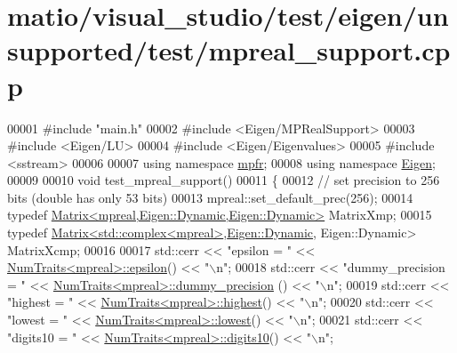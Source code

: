 \hypertarget{matio_2visual__studio_2test_2eigen_2unsupported_2test_2mpreal__support_8cpp_source}{}\section{matio/visual\+\_\+studio/test/eigen/unsupported/test/mpreal\+\_\+support.cpp}
\label{matio_2visual__studio_2test_2eigen_2unsupported_2test_2mpreal__support_8cpp_source}

\begin{DoxyCode}
00001 \textcolor{preprocessor}{#include "main.h"}
00002 \textcolor{preprocessor}{#include <Eigen/MPRealSupport>}
00003 \textcolor{preprocessor}{#include <Eigen/LU>}
00004 \textcolor{preprocessor}{#include <Eigen/Eigenvalues>}
00005 \textcolor{preprocessor}{#include <sstream>}
00006 
00007 \textcolor{keyword}{using namespace }\hyperlink{namespacempfr}{mpfr};
00008 \textcolor{keyword}{using namespace }\hyperlink{namespace_eigen}{Eigen};
00009 
00010 \textcolor{keywordtype}{void} test\_mpreal\_support()
00011 \{
00012   \textcolor{comment}{// set precision to 256 bits (double has only 53 bits)}
00013   mpreal::set\_default\_prec(256);
00014   \textcolor{keyword}{typedef} \hyperlink{group___core___module_class_eigen_1_1_matrix}{Matrix<mpreal,Eigen::Dynamic,Eigen::Dynamic>} 
      MatrixXmp;
00015   \textcolor{keyword}{typedef} \hyperlink{group___core___module_class_eigen_1_1_matrix}{Matrix<std::complex<mpreal>},\hyperlink{namespace_eigen_ad81fa7195215a0ce30017dfac309f0b2}{Eigen::Dynamic},
      Eigen::Dynamic> MatrixXcmp;
00016 
00017   std::cerr << \textcolor{stringliteral}{"epsilon =         "} << \hyperlink{group___core___module_struct_eigen_1_1_num_traits}{NumTraits<mpreal>::epsilon}() << \textcolor{stringliteral}{"\(\backslash\)n"};
00018   std::cerr << \textcolor{stringliteral}{"dummy\_precision = "} << \hyperlink{group___core___module_struct_eigen_1_1_num_traits}{NumTraits<mpreal>::dummy\_precision}
      () << \textcolor{stringliteral}{"\(\backslash\)n"};
00019   std::cerr << \textcolor{stringliteral}{"highest =         "} << \hyperlink{group___core___module_struct_eigen_1_1_num_traits}{NumTraits<mpreal>::highest}() << \textcolor{stringliteral}{"\(\backslash\)n"};
00020   std::cerr << \textcolor{stringliteral}{"lowest =          "} << \hyperlink{group___core___module_struct_eigen_1_1_num_traits}{NumTraits<mpreal>::lowest}() << \textcolor{stringliteral}{"\(\backslash\)n"};
00021   std::cerr << \textcolor{stringliteral}{"digits10 =        "} << \hyperlink{group___core___module_struct_eigen_1_1_num_traits}{NumTraits<mpreal>::digits10}() << \textcolor{stringliteral}{"\(\backslash\)n"};

\end{DoxyCode}
